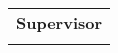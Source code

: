 \begin{table}[h]
\begin{tabularx}{\textwidth}{>{\raggedright\arraybackslash}X} %
\textbf{Supervisor}
\\
\textbf{\supervisor{}} \newline
\supervisoraffiliation{}
\\
\end{tabularx}
\end{table}